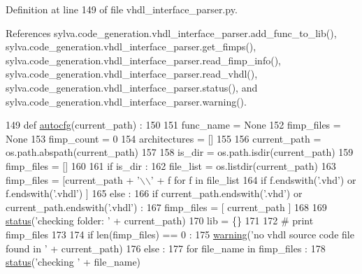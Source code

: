 Definition at line 149 of file vhdl\+\_\+interface\+\_\+parser.\+py.



References sylva.\+code\+\_\+generation.\+vhdl\+\_\+interface\+\_\+parser.\+add\+\_\+func\+\_\+to\+\_\+lib(), sylva.\+code\+\_\+generation.\+vhdl\+\_\+interface\+\_\+parser.\+get\+\_\+fimps(), sylva.\+code\+\_\+generation.\+vhdl\+\_\+interface\+\_\+parser.\+read\+\_\+fimp\+\_\+info(), sylva.\+code\+\_\+generation.\+vhdl\+\_\+interface\+\_\+parser.\+read\+\_\+vhdl(), sylva.\+code\+\_\+generation.\+vhdl\+\_\+interface\+\_\+parser.\+status(), and sylva.\+code\+\_\+generation.\+vhdl\+\_\+interface\+\_\+parser.\+warning().


\begin{DoxyCode}
149 \textcolor{keyword}{def }\hyperlink{namespacesylva_1_1code__generation_1_1vhdl__interface__parser_ac700c06f85e744c061a573dc897c9d6f}{autocfg}(current\_path) :
150 
151   func\_name = \textcolor{keywordtype}{None}
152   fimp\_files = \textcolor{keywordtype}{None}
153   fimp\_count = 0
154   architectures = []
155 
156   current\_path = os.path.abspath(current\_path)
157 
158   is\_dir = os.path.isdir(current\_path)
159   fimp\_files = []
160 
161   \textcolor{keywordflow}{if} is\_dir :
162     file\_list = os.listdir(current\_path)
163     fimp\_files = [current\_path + \textcolor{stringliteral}{'\(\backslash\)\(\backslash\)'} + f \textcolor{keywordflow}{for} f \textcolor{keywordflow}{in} file\_list
164                   \textcolor{keywordflow}{if} f.endswith(\textcolor{stringliteral}{'.vhd'}) \textcolor{keywordflow}{or} f.endswith(\textcolor{stringliteral}{'.vhdl'}) ]
165   \textcolor{keywordflow}{else} :
166     \textcolor{keywordflow}{if} current\_path.endswith(\textcolor{stringliteral}{'.vhd'}) \textcolor{keywordflow}{or} current\_path.endswith(\textcolor{stringliteral}{'.vhdl'}) :
167       fimp\_files = [ current\_path ]
168 
169   \hyperlink{namespacesylva_1_1code__generation_1_1vhdl__interface__parser_a531a0f0634e3fde1c48dc06c7c8c019f}{status}(\textcolor{stringliteral}{'checking folder: '} + current\_path)
170   lib = \{\}
171 
172   \textcolor{comment}{# print fimp\_files}
173 
174   \textcolor{keywordflow}{if} len(fimp\_files) == 0 :
175     \hyperlink{namespacesylva_1_1code__generation_1_1vhdl__interface__parser_a63f8ceba954ddb8e1d7713fead5ffc9c}{warning}(\textcolor{stringliteral}{'no vhdl source code file found in '} + current\_path)
176   \textcolor{keywordflow}{else} :
177     \textcolor{keywordflow}{for} file\_name \textcolor{keywordflow}{in} fimp\_files :
178       \hyperlink{namespacesylva_1_1code__generation_1_1vhdl__interface__parser_a531a0f0634e3fde1c48dc06c7c8c019f}{status}(\textcolor{stringliteral}{'checking '} + file\_name)

\end{DoxyCode}
